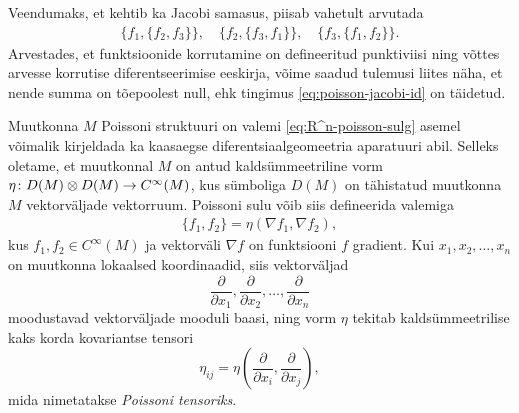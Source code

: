 Veendumaks, et kehtib ka Jacobi samasus, piisab vahetult arvutada
\begin{align*}
    \{f_1, \{f_2, f_3\}\}, \quad
    \{f_2, \{f_3, f_1\}\}, \quad
    \{f_3, \{f_1, f_2\}\}.
\end{align*}
Arvestades, et funktsioonide korrutamine on defineeritud punktiviisi ning
võttes arvesse korrutise diferentseerimise eeskirja, võime saadud tulemusi
liites näha, et nende summa on tõepoolest null, ehk tingimus
\eqref{eq:poisson-jacobi-id} on täidetud.

Muutkonna $M$ Poissoni struktuuri on valemi \eqref{eq:R^n-poisson-sulg}
asemel võimalik kirjeldada ka kaasaegse diferentsiaalgeomeetria
aparatuuri abil. Selleks oletame, et muutkonnal $M$ on antud
kaldsümmeetriline vorm $\eta \colon D(M) \otimes D(M) \to C^\infty(M)$,
kus sümboliga $D(M)$ on tähistatud muutkonna $M$ vektorväljade vektorruum.
Poissoni sulu võib siis defineerida valemiga
\begin{align}\label{eq:poisson-brac-nabla}
    \{ f_1, f_2 \} = \eta(\nabla f_1, \nabla f_2),
\end{align}
kus $f_1, f_2 \in C^\infty(M)$ ja vektorväli $\nabla f$ on
funktsiooni $f$ gradient. Kui $x_1, x_2, \dots, x_n$ on muutkonna
lokaalsed koordinaadid, siis vektorväljad
\[
    \frac{\partial}{\partial x_1},
    \frac{\partial}{\partial x_2},
    \dots,
    \frac{\partial}{\partial x_n}
\]
moodustavad vektorväljade mooduli
baasi, ning vorm $\eta$ tekitab kaldsümmeetrilise kaks korda kovariantse
tensori
\[
    \eta_{ij} = \eta\left(
        \frac{\partial}{\partial x_i}, \frac{\partial}{\partial x_j}
    \right),
\]
mida nimetatakse \emph{Poissoni tensoriks}.

